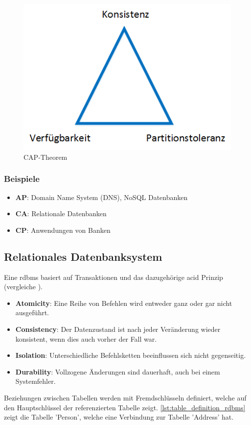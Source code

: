 \begin{figure}[h]
\centering
\includegraphics[scale=0.8]{images/visio/cap.png}
\caption[CAP-Theorem]{CAP-Theorem \selfmade{}}
\label{fig:cap}
\end{figure}

\subsubsection{Beispiele}

\begin{itemize}
	\item \textbf{AP}: Domain Name System (DNS), NoSQL Datenbanken
	\item \textbf{CA}: Relationale Datenbanken
	\item \textbf{CP}: Anwendungen von Banken
\end{itemize}

\subsection{Relationales Datenbanksystem}\label{rdbms}
Eine \gls{rdbms} basiert auf Transaktionen und das dazugehörige \gls{acid} Prinzip (vergleiche \cite{limited2010introduction}). 
\begin{itemize}
	\item \textbf{Atomicity}: Eine Reihe von Befehlen wird entweder ganz oder gar nicht ausgeführt.
	\item \textbf{Consistency}: Der Datenzustand ist nach jeder Veränderung wieder konsistent, wenn dies auch vorher der Fall war.
	\item \textbf{Isolation}: Unterschiedliche Befehlsketten beeinflussen sich nicht gegenseitig.
	\item \textbf{Durability}: Vollzogene Änderungen sind dauerhaft, auch bei einem Systemfehler.
\end{itemize}
Beziehungen zwischen Tabellen werden mit Fremdschlüsseln definiert, welche auf den Hauptschlüssel der referenzierten Tabelle zeigt. \autoref{lst:table_definition_rdbms} zeigt die
Tabelle 'Person', welche eine Verbindung zur Tabelle 'Address' hat.

